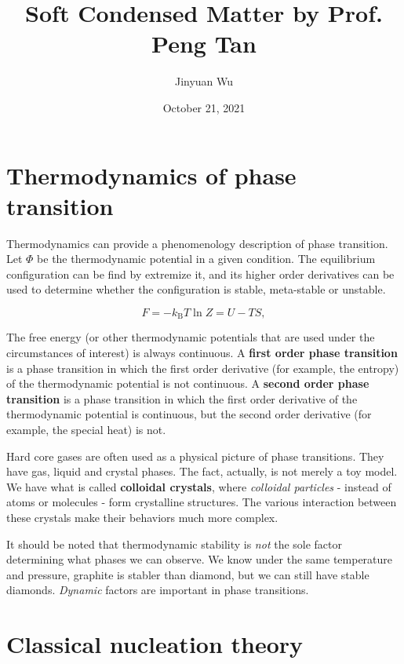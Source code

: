 \documentclass[hyperref, a4paper]{article}
\title{Soft Condensed Matter by Prof. Peng Tan}
\author{Jinyuan Wu}
\date{October 21, 2021}
\newcommand*{\concept}[1]{{\textbf{#1}}}
\begin{document}
\maketitle

\section{Thermodynamics of phase transition}

Thermodynamics can provide a phenomenology description of phase transition.
Let $\Phi$ be the thermodynamic potential in a given condition.
The equilibrium configuration can be find by extremize it, and its higher order derivatives can be used to determine whether the configuration is stable, meta-stable or unstable.

\begin{equation}
    F = - k_\text{B} T \ln Z = U - TS, 
\end{equation}

The free energy (or other thermodynamic potentials that are used under the circumstances of interest) is always continuous.
A \concept{first order phase transition} is a phase transition in which the first order derivative (for example, the entropy) of the thermodynamic potential is not continuous.
A \concept{second order phase transition} is a phase transition in which the first order derivative of the thermodynamic potential is continuous, but the second order derivative (for example, the special heat) is not.

Hard core gases are often used as a physical picture of phase transitions.
They have gas, liquid and crystal phases.
The fact, actually, is not merely a toy model.
We have what is called \concept{colloidal crystals}, where \emph{colloidal particles} - instead of atoms or molecules - form crystalline structures.
The various interaction between these crystals make their behaviors much more complex.

It should be noted that thermodynamic stability is \emph{not} the sole factor determining what phases we can observe.
We know under the same temperature and pressure, graphite is stabler than diamond, but we can still have stable diamonds.
\emph{Dynamic} factors are important in phase transitions.

\section{Classical nucleation theory}
\end{document}
